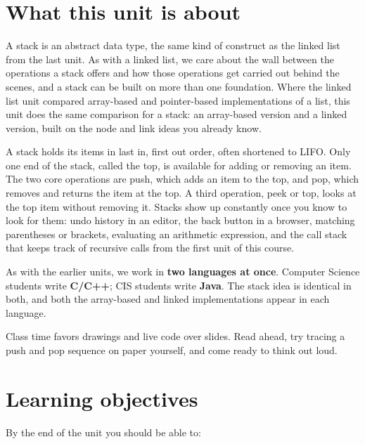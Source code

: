 \documentclass[11pt]{article}
\begin{document}

\section{What this unit is about}

A stack is an abstract data type, the same kind of construct as the linked list from the
last unit. As with a linked list, we care about the wall between the operations a stack
offers and how those operations get carried out behind the scenes, and a stack can be
built on more than one foundation. Where the linked list unit compared array-based and
pointer-based implementations of a list, this unit does the same comparison for a stack:
an array-based version and a linked version, built on the node and link ideas you already
know.

A stack holds its items in last in, first out order, often shortened to LIFO. Only one end
of the stack, called the top, is available for adding or removing an item. The two core
operations are push, which adds an item to the top, and pop, which removes and returns the
item at the top. A third operation, peek or top, looks at the top item without removing it.
Stacks show up constantly once you know to look for them: undo history in an editor,
the back button in a browser, matching parentheses or brackets, evaluating an arithmetic
expression, and the call stack that keeps track of recursive calls from the first unit of
this course.

As with the earlier units, we work in \textbf{two languages at once}. Computer Science
students write \textbf{C/C++}; CIS students write \textbf{Java}. The stack idea is
identical in both, and both the array-based and linked implementations appear in each
language.

Class time favors drawings and live code over slides. Read ahead, try tracing a push and
pop sequence on paper yourself, and come ready to think out loud.

\section{Learning objectives}

By the end of the unit you should be able to:
\end{document}
